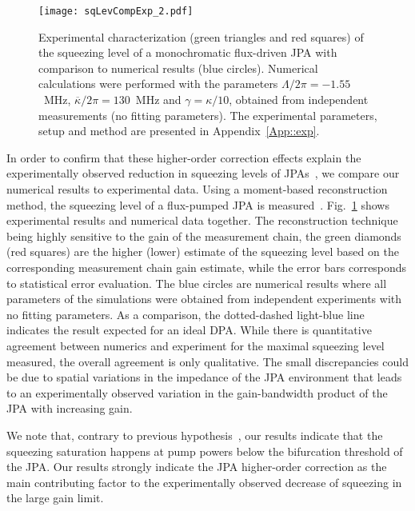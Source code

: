 \documentclass[pra,twocolumn,superscriptaddress]{revtex4-1}
\newcommand{\kappaTot}[0]{\overline{\kappa}}
\begin{document}
\begin{figure}[tb]
	\texttt{[image: sqLevCompExp\_2.pdf]}
	\caption{
	Experimental characterization (green triangles and red squares) of the squeezing level of a monochromatic flux-driven JPA with comparison to numerical results (blue circles). Numerical calculations were performed with the parameters $\Lambda/2\pi = -1.55$~MHz, $\kappaTot/2\pi = 130$~MHz and $\gamma= \kappa/10$, obtained from independent measurements (no fitting parameters). {The experimental parameters, setup and method are presented in Appendix~\ref{App::exp}}.
	}
	\label{fig:squeezingExp}
\end{figure}

In order to confirm that these higher-order correction effects explain the experimentally observed reduction in squeezing levels of JPAs~\cite{Castellanos-Beltran:2008vn,Mallet:2011fk,Murch:2013kx,Zhong:2013vn}, we compare our numerical results to experimental data. Using a moment-based reconstruction method, the squeezing level of a flux-pumped JPA is measured~\cite{Silva:2010mi,Eichler_PRL_2011,Menzel_PRL_2012}.
Fig.~\ref{fig:squeezingExp} shows experimental results and numerical data together. The reconstruction technique being highly sensitive to the gain of the measurement chain, the green diamonds (red squares) are the higher (lower) estimate of the squeezing level based on the corresponding measurement chain gain estimate, while the error bars corresponds to statistical error evaluation. The blue circles are numerical results where all parameters of the simulations were obtained from independent experiments with no fitting parameters. As a comparison, the dotted-dashed light-blue line indicates the result expected for an ideal DPA. 
While there is quantitative agreement between numerics and experiment for the maximal squeezing level measured, the overall agreement is only qualitative. 
The small discrepancies could be due to spatial variations in the impedance of the JPA environment that leads to an experimentally observed variation in the gain-bandwidth product of the JPA with increasing gain. 

We note that, contrary to previous hypothesis~\cite{Zhong:2013vn}, our results indicate that the squeezing saturation happens at pump powers below the bifurcation threshold of the JPA. Our results strongly indicate the JPA higher-order correction as the main contributing factor to the experimentally observed decrease of squeezing in the large gain limit.
\end{document}
